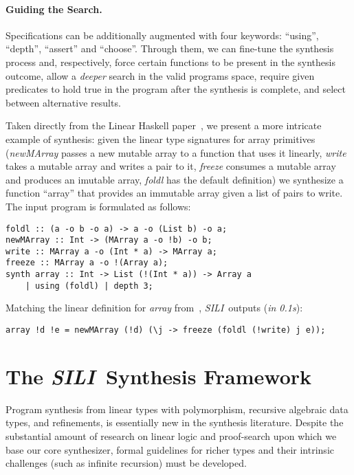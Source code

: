 \documentclass{llncs}
\newcommand{\mypara}[1]{\paragraph{\textbf{#1}.}}
\newcommand{\synname}{\emph{SILI}}
\begin{document}
\mypara{Guiding the Search} Specifications can be additionally
augmented with four keywords: ``using'', ``depth'', ``assert'' and ``choose''.
Through them, we can fine-tune the synthesis process and,
respectively, force certain functions to be present in the synthesis
outcome, allow a \emph{deeper} search in the valid programs space,
require given predicates to hold true in the program after the
synthesis is complete, and select between alternative results.

Taken directly from the Linear Haskell paper~\cite{Bernardy_2018}, we present a
more intricate example of synthesis: given the linear type signatures for array
primitives (\emph{newMArray} passes a new mutable array to a function that uses
it linearly, \emph{write} takes a mutable array and writes a pair to it,
\emph{freeze} consumes a mutable array and produces an imutable array,
\emph{foldl} has the default definition) we synthesize a function
``array'' that provides an immutable array given a list of pairs to write. The input program is formulated as
follows:
%
\begin{verbatim}
foldl :: (a -o b -o a) -> a -o (List b) -o a;
newMArray :: Int -> (MArray a -o !b) -o b;
write :: MArray a -o (Int * a) -> MArray a;
freeze :: MArray a -o !(Array a);
synth array :: Int -> List (!(Int * a)) -> Array a
    | using (foldl) | depth 3;
\end{verbatim}
%
Matching the linear definition for \emph{array} from~\cite{Bernardy_2018}, \synname\
outputs (\emph{in 0.1s}):
%
\begin{verbatim}
array !d !e = newMArray (!d) (\j -> freeze (foldl (!write) j e));
\end{verbatim}

\section{The \synname\ Synthesis Framework}\label{sec:formal_system}

Program synthesis from linear types with polymorphism, recursive
algebraic data types, and refinements, is essentially new in the synthesis 
literature. Despite the substantial amount of research on linear logic and
proof-search upon which we base our core synthesizer, formal guidelines for
richer types and their intrinsic challenges (such as infinite
recursion) must be developed.
\end{document}
